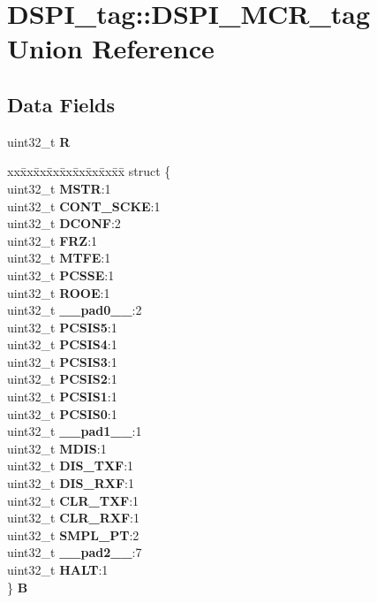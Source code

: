 \hypertarget{unionDSPI__tag_1_1DSPI__MCR__tag}{}\section{D\+S\+P\+I\+\_\+tag\+::D\+S\+P\+I\+\_\+\+M\+C\+R\+\_\+tag Union Reference}
\label{unionDSPI__tag_1_1DSPI__MCR__tag}
\subsection*{Data Fields}
\begin{DoxyCompactItemize}
\item 
\mbox{\label{unionDSPI__tag_1_1DSPI__MCR__tag_ad4060ab17ea2f7edc26061b5eb7c8754}} 
uint32\+\_\+t {\bfseries R}
\item 
\mbox{\label{unionDSPI__tag_1_1DSPI__MCR__tag_a70ec3ab80cb3edb1ad0e586258d3ba08}} 
\begin{tabbing}
xx\=xx\=xx\=xx\=xx\=xx\=xx\=xx\=xx\=\kill
struct \{\\
\>uint32\_t {\bfseries MSTR}:1\\
\>uint32\_t {\bfseries CONT\_SCKE}:1\\
\>uint32\_t {\bfseries DCONF}:2\\
\>uint32\_t {\bfseries FRZ}:1\\
\>uint32\_t {\bfseries MTFE}:1\\
\>uint32\_t {\bfseries PCSSE}:1\\
\>uint32\_t {\bfseries ROOE}:1\\
\>uint32\_t {\bfseries \_\_pad0\_\_}:2\\
\>uint32\_t {\bfseries PCSIS5}:1\\
\>uint32\_t {\bfseries PCSIS4}:1\\
\>uint32\_t {\bfseries PCSIS3}:1\\
\>uint32\_t {\bfseries PCSIS2}:1\\
\>uint32\_t {\bfseries PCSIS1}:1\\
\>uint32\_t {\bfseries PCSIS0}:1\\
\>uint32\_t {\bfseries \_\_pad1\_\_}:1\\
\>uint32\_t {\bfseries MDIS}:1\\
\>uint32\_t {\bfseries DIS\_TXF}:1\\
\>uint32\_t {\bfseries DIS\_RXF}:1\\
\>uint32\_t {\bfseries CLR\_TXF}:1\\
\>uint32\_t {\bfseries CLR\_RXF}:1\\
\>uint32\_t {\bfseries SMPL\_PT}:2\\
\>uint32\_t {\bfseries \_\_pad2\_\_}:7\\
\>uint32\_t {\bfseries HALT}:1\\
\} {\bfseries B}\\


\end{tabbing}
\end{DoxyCompactItemize}
